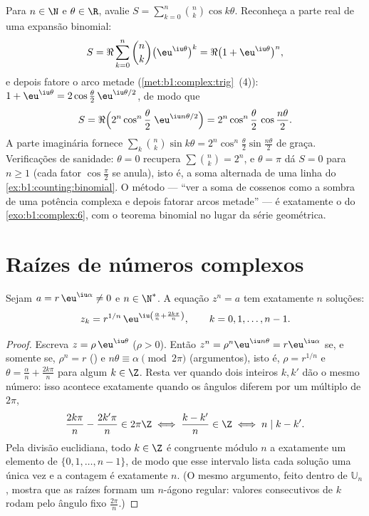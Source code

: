 \begin{example}\label{ex:b1:complex:binomsum}
Para $n \in \N$ e $\theta \in \R$, avalie $S =
\sum_{k=0}^{n}\binom nk \cos k\theta$. Reconheça a parte real de
uma expansão binomial:
\[
S = \Re\sum_{k=0}^n \binom nk \bigl(\eu^{\iu\theta}\bigr)^k
= \Re\bigl(1 + \eu^{\iu\theta}\bigr)^n ,
\]
e depois fatore o arco metade (\cref{met:b1:complex:trig}~(4)): $1 +
\eu^{\iu\theta} = 2\cos\frac\theta2\,\eu^{\iu\theta/2}$, de modo que
\[
S = \Re\Bigl(2^n\cos^n\frac\theta2\;\eu^{\iu n\theta/2}\Bigr)
= 2^n \cos^n\frac\theta2\,\cos\frac{n\theta}2 .
\]
A parte imaginária fornece $\sum_k\binom nk\sin k\theta =
2^n\cos^n\frac\theta2\sin\frac{n\theta}2$ de graça. Verificações de sanidade:
$\theta = 0$ recupera $\sum\binom nk = 2^n$, e $\theta = \pi$
dá $S = 0$ para $n \geq 1$ (cada fator $\cos\frac\pi2$
se anula), isto é, a soma alternada de uma linha do
\cref{ex:b1:counting:binomial}. O método --- ``ver a soma de cossenos
como a sombra de uma potência complexa e depois fatorar arcos metade''
--- é exatamente o do \cref{exo:b1:complex:6}, com o teorema binomial
no lugar da série geométrica.
\end{example}

\section{Raízes de números complexos}

\begin{theorem}\label{thm:b1:complex:roots}
Sejam $a = r\,\eu^{\iu\alpha} \neq 0$ e $n \in \N^*$. A equação
$z^n = a$ tem exatamente $n$ soluções:
\[
z_k = r^{1/n}\, \eu^{\iu\left(\frac{\alpha}{n} +
\frac{2k\pi}{n}\right)},
\qquad k = 0, 1, \dots, n - 1 .
\]
\end{theorem}

\begin{proof}
Escreva $z = \rho\,\eu^{\iu\theta}$ ($\rho > 0$). Então $z^n =
\rho^n \eu^{\iu n\theta} = r \eu^{\iu\alpha}$ se, e somente se, $\rho^n
= r$ () e $n\theta \equiv \alpha \pmod{2\pi}$ (argumentos),
isto é, $\rho = r^{1/n}$ e $\theta = \frac{\alpha}{n} +
\frac{2k\pi}{n}$ para algum $k \in \Z$. Resta ver quando dois
inteiros $k, k'$ dão o mesmo número: isso acontece exatamente quando
os ângulos diferem por um múltiplo de $2\pi$,
\[
\frac{2k\pi}n - \frac{2k'\pi}n \in 2\pi\Z
\iff \frac{k - k'}n \in \Z
\iff n \mid k - k' .
\]
Pela divisão euclidiana, todo $k \in \Z$ é congruente módulo $n$ a
exatamente um elemento de $\{0, 1, \dots, n-1\}$, de modo que esse intervalo lista
cada solução uma única vez e a contagem é exatamente $n$. (O mesmo
argumento, feito dentro de $\mathbb U_n$, mostra que as raízes formam um
$n$-ágono regular: valores consecutivos de $k$ rodam pelo ângulo fixo
$\frac{2\pi}n$.)
\end{proof}

